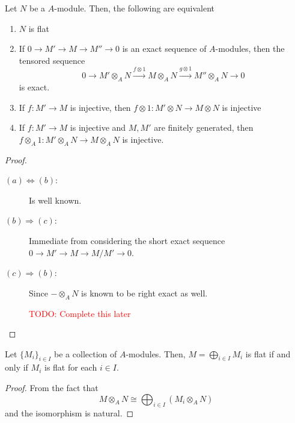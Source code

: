 \begin{theorem}
    Let $N$ be a $A$-module. Then, the following are equivalent 
    \begin{enumerate}[label=(\alph*)]
        \item $N$ is flat 
        \item If $0\rightarrow M'\rightarrow M\rightarrow M''\rightarrow 0$ is an exact sequence of $A$-modules, then the tensored sequence 
        \begin{equation*}
        0\longrightarrow M'\otimes_A N\stackrel{f\otimes 1}{\longrightarrow} M\otimes_A N\stackrel{g\otimes 1}{\longrightarrow} M''\otimes_A N\longrightarrow 0
        \end{equation*}
        is exact.
        \item If $f: M'\to M$ is injective, then $f\otimes 1: M'\otimes N\to M\otimes N$ is injective 
        \item If $f: M'\to M$ is injective and $M,M'$ are finitely generated, then $f\otimes_A 1: M'\otimes_A N\to M\otimes_A N$ is injective.
    \end{enumerate}
\end{theorem}
\begin{proof}
\hfill 
\begin{description}
\item[$(a)\Longleftrightarrow(b)$:] Is well known.
\item[$(b)\Longrightarrow(c)$:] Immediate from considering the short exact sequence $0\rightarrow M'\rightarrow M\rightarrow M/M'\rightarrow0$.
\item[$(c)\Longrightarrow(b)$:] Since $-\otimes_A N$ is known to be right exact as well. 
\item[] \textcolor{red}{TODO: Complete this later}
\end{description}
\end{proof}

\begin{proposition}
    Let $\{M_i\}_{i\in I}$ be a collection of $A$-modules. Then, $M = \bigoplus\limits_{i\in I}M_i$ is flat if and only if $M_i$ is flat for each $i\in I$.
\end{proposition}
\begin{proof}
    From the fact that 
    \begin{equation*}
        M\otimes_A N\cong\bigoplus_{i\in I}(M_i\otimes_A N)
    \end{equation*}
    and the isomorphism is natural.
\end{proof}

